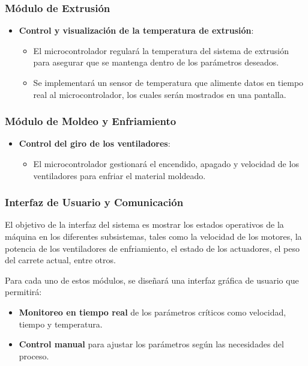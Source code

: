 \documentclass[14pt,oneside]{extarticle} %
\begin{document}
\subsubsection{Módulo de Extrusión}
\begin{itemize}
    \item \textbf{Control y visualización de la temperatura de extrusión}:
    \begin{itemize}
        \item El microcontrolador regulará la temperatura del sistema de extrusión para asegurar que se mantenga dentro de los parámetros deseados.
        \item Se implementará un sensor de temperatura que alimente datos en tiempo real al microcontrolador, los cuales serán mostrados en una pantalla.
    \end{itemize}
\end{itemize}

\subsubsection{Módulo de Moldeo y Enfriamiento}
\begin{itemize}
    \item \textbf{Control del giro de los ventiladores}:
    \begin{itemize}
        \item El microcontrolador gestionará el encendido, apagado y velocidad de los ventiladores para enfriar el material moldeado.
    \end{itemize}
\end{itemize}

\subsubsection{Interfaz de Usuario y Comunicación}

El objetivo de la interfaz del sistema es mostrar los estados operativos de la máquina en los diferentes subsistemas, tales como la velocidad de los motores, la potencia de los ventiladores de enfriamiento, el estado de los actuadores, el peso del carrete actual, entre otros. 

Para cada uno de estos módulos, se diseñará una interfaz gráfica de usuario que permitirá:

\begin{itemize}
    \item \textbf{Monitoreo en tiempo real} de los parámetros críticos como velocidad, tiempo y temperatura.
    \item \textbf{Control manual} para ajustar los parámetros según las necesidades del proceso.
\end{itemize}
\end{document}
